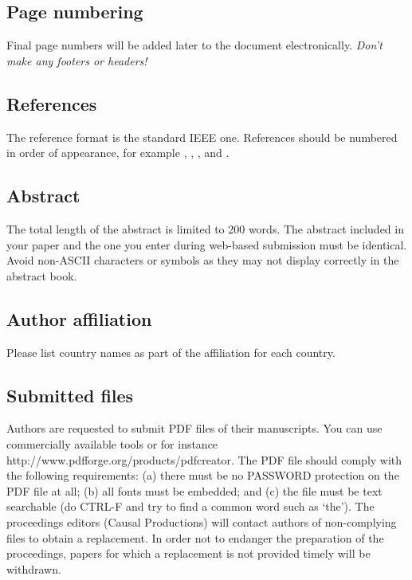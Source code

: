 \documentclass[a4paper]{article}
\begin{document}
  
    \subsection{Page numbering}

      Final page numbers will be added later to the document electronically.
      \emph{Don't make any footers or headers!}

  
    \subsection{References}

      The reference format is the standard IEEE one.
      References should be numbered in order of appearance, for example \cite{Davis80-COP}, \cite{Rabiner89-ATO}, \cite[pp.\ 417--422]{Hastie09-TEO}, and \cite{YourName16-XXX}.

  
    \subsection{Abstract}

      The total length of the abstract is limited to 200 words. 
      The abstract included in your paper and the one you enter during web-based submission must be identical. 
      Avoid non-ASCII characters or symbols as they may not display correctly in the abstract book.

  
    \subsection{Author affiliation}
  
      Please list country names as part of the affiliation for each country.

  
    \subsection{Submitted files}
  
      Authors are requested to submit PDF files of their manuscripts. 
      You can use commercially available tools or for instance http://www.pdfforge.org/products/pdfcreator.
      The PDF file should comply with the following requirements: 
      (a) there must be no PASSWORD protection on the PDF file at all; 
      (b) all fonts must be embedded; and
      (c) the file must be text searchable (do CTRL-F and try to find a common word such as `the').
      The proceedings editors (Causal Productions) will contact authors of non-complying files to obtain a replacement. 
      In order not to endanger the preparation of the proceedings, papers for which a replacement is not provided timely will be withdrawn.
\end{document}

